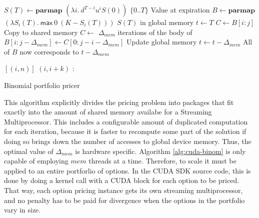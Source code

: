 \begin{algorithm}
\begin{algorithmic}
  \State $S(T) \gets \mathbf{parmap}$ $(\lambda i.\ d^{T-i}u^{i}S(0))$ $\{0..T\}$ \Comment Value at expiration
  \State $B \gets \mathbf{parmap}$ $(\lambda S_i(T).\ \mathsf{max}\ 0\ (K-S_i(T)))$ $S(T)$ \Comment in global memory
  \State $t \gets T$
      \State $C \gets B[i:j] $ \Comment Copy to shared memory
      \State $C \gets$ $\Delta_{mem}$ iterations of the body of 
      \State $B[i:j-\Delta_{mem}] \gets C[0:j-i-\Delta_{mem}] $ \Comment Update global memory
    \EndFor
    \State $t \gets t -\Delta_{mem}$ \Comment All of $B$ now corresponds to $t -\Delta_{mem}$
  \EndWhile
\EndFunction

\State\Return $[(i,n)]$
\Else
\State
\Return $(i,i+k)$ : 
\EndIf
\EndFunction
\end{algorithmic}
\caption{Binomial portfolio pricer}
\label{alg:cuda-binom}
\end{algorithm}

This algorithm explicitly divides the pricing problem into packages that fit
exactly into the amount of shared memory availabe for a Streaming
Multiprocessor. This includes a configurable amount of duplicated computation
for each iteration, because it is faster to recompute some part of the solution
if doing so brings down the number of accesses to global device memory. Thus,
the optimal value of $\Delta_{mem}$ is hardware specific.  Algorithm
\ref{alg:cuda-binom} is only capable of employing $mem$ threads at a time.
Therefore, to scale it must be applied to an entire portforlio of options.  In
the CUDA SDK source code, this is done by doing a kernel call with a CUDA block
for each option to be priced. That way, each option pricing instance gets its
own streaming multiprocessor, and no penalty has to be paid for divergence when
the options in the portfolio vary in size.

